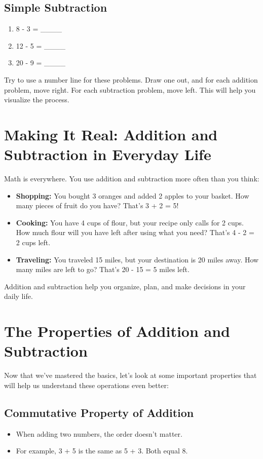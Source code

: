 \subsection{Simple Subtraction}
\begin{enumerate}
    \item 8 - 3 = \_\_\_\_
    \item 12 - 5 = \_\_\_\_
    \item 20 - 9 = \_\_\_\_
\end{enumerate}

Try to use a number line for these problems. Draw one out, and for each addition problem, move right. For each subtraction problem, move left. This will help you visualize the process.

\section{Making It Real: Addition and Subtraction in Everyday Life}
Math is everywhere. You use addition and subtraction more often than you think:
\begin{itemize}
    \item \textbf{Shopping:} You bought 3 oranges and added 2 apples to your basket. How many pieces of fruit do you have? That’s 3 + 2 = 5!
    \item \textbf{Cooking:} You have 4 cups of flour, but your recipe only calls for 2 cups. How much flour will you have left after using what you need? That’s 4 - 2 = 2 cups left.
    \item \textbf{Traveling:} You traveled 15 miles, but your destination is 20 miles away. How many miles are left to go? That’s 20 - 15 = 5 miles left.
\end{itemize}

Addition and subtraction help you organize, plan, and make decisions in your daily life.

\section{The Properties of Addition and Subtraction}
Now that we’ve mastered the basics, let’s look at some important properties that will help us understand these operations even better:

\subsection{Commutative Property of Addition}
\begin{itemize}
    \item When adding two numbers, the order doesn’t matter.
    \item For example, 3 + 5 is the same as 5 + 3. Both equal 8.
\end{itemize}

